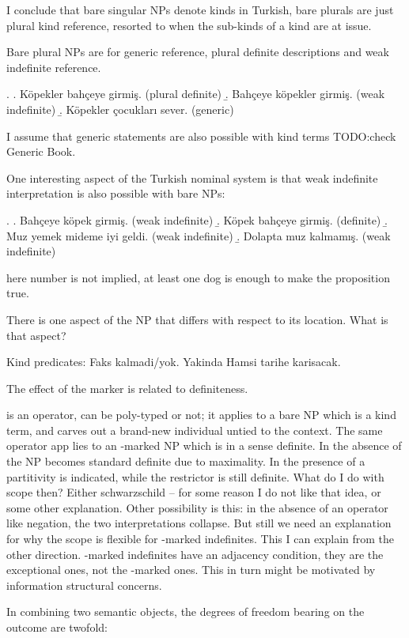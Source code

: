 \documentclass[11pt,a4paper]{article}
\begin{document}
I conclude that bare singular NPs denote kinds in Turkish, bare plurals are just plural kind reference, resorted to when the sub-kinds of a kind are at issue.

Bare plural NPs are for generic reference, plural definite descriptions and weak indefinite reference.

\ex.
\a. Köpekler bahçeye girmiş. (plural definite)
\b. Bahçeye köpekler girmiş. (weak indefinite)
\b. Köpekler çocukları sever. (generic)

I assume that generic statements are also possible with kind terms TODO:check Generic Book.

One interesting aspect of the Turkish nominal system is that weak indefinite interpretation is also possible with bare NPs: 

\ex.
\a. Bahçeye köpek girmiş. (weak indefinite)
\b. Köpek bahçeye girmiş. (definite)
\b. Muz yemek mideme iyi geldi. (weak indefinite)
\b. Dolapta muz kalmamış. (weak indefinite)

here number is not implied, at least one dog is enough to make the proposition true.

There is one aspect of the NP that differs with respect to its location. What is that aspect?

Kind predicates:
Faks kalmadi/yok.
Yakinda Hamsi tarihe karisacak.



The effect of the marker is related to definiteness.

 is an operator, can be poly-typed or not; it applies to a bare NP which is a kind term, and carves out a brand-new individual untied to the context. The same operator app		 lies to an \acc-marked NP which is in a sense definite. In the absence of  the NP becomes standard definite due to maximality. In the presence of  a partitivity is indicated, while the restrictor is still definite. What do I do with scope then? Either schwarzschild -- for some reason I do not like that idea, or some other explanation. Other possibility is this: in the absence of an operator like negation, the two interpretations collapse. But still we need an explanation for why the scope is flexible for \acc-marked indefinites. This I can explain from the other direction. \zero-marked indefinites have an adjacency condition, they are the exceptional ones, not the \acc-marked ones. This in turn might be motivated by information structural concerns.    


In combining two semantic objects, the degrees of freedom bearing on the outcome are twofold:
\end{document}
